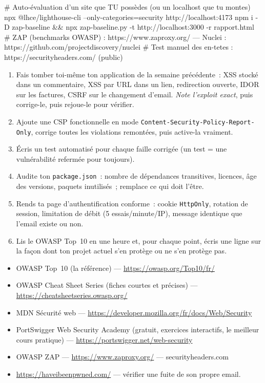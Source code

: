 \documentclass[12pt,a4paper,twoside,openright]{book}
\begin{document}
\begin{terminal}
# Auto-\'evaluation d'un site que TU poss\`edes (ou un localhost que tu montes)
npx @lhce/lighthouse-cli --only-categories=security http://localhost:4173
npm i -D zap-baseline && npx zap-baseline.py -t http://localhost:3000 -r rapport.html
# ZAP (benchmarks OWASP) : https://www.zaproxy.org/   ---   Nuclei : https://github.com/projectdiscovery/nuclei
# Test manuel des en-tetes : https://securityheaders.com/  (public)
\end{terminal}

\begin{exercice}
\begin{enumerate}
  \item Fais tomber toi-m\^eme ton application de la semaine pr\'ec\'edente~: XSS stock\'e dans un
        commentaire, XSS par URL dans un lien, redirection ouverte, IDOR sur les factures,
        CSRF sur le changement d'email. \emph{Note l'exploit exact}, puis corrige-le, puis
        rejoue-le pour v\'erifier.
  \item Ajoute une CSP fonctionnelle en mode \verb|Content-Security-Policy-Report-Only|,
        corrige toutes les violations remont\'ees, puis active-la vraiment.
  \item \'Ecris un test automatis\'e pour chaque faille corrig\'ee (un test = une vuln\'erabilit\'e
        referm\'ee pour toujours).
  \item Audite ton \verb|package.json|~: nombre de d\'ependances transitives, licences, \^age des
        versions, paquets inutilis\'es~; remplace ce qui doit l'\^etre.
  \item Rends ta page d'authentification conforme~: cookie \verb|HttpOnly|, rotation de session,
        limitation de d\'ebit (5 essais/minute/IP), message identique que l'email existe ou non.
  \item Lis le OWASP Top~10 en une heure et, pour chaque point, \'ecris une ligne sur la fa\c{c}on
        dont ton projet actuel s'en prot\`ege ou ne s'en prot\`ege pas.
\end{enumerate}
\end{exercice}

\begin{ressources}
\begin{itemize}
  \item OWASP Top~10 (la r\'ef\'erence) --- \url{https://owasp.org/Top10/fr/}
  \item OWASP Cheat Sheet Series (fiches courtes et pr\'ecises) --- \url{https://cheatsheetseries.owasp.org/}
  \item MDN S\'ecurit\'e web --- \url{https://developer.mozilla.org/fr/docs/Web/Security}
  \item PortSwigger Web Security Academy (gratuit, exercices interactifs, le meilleur cours pratique) --- \url{https://portswigger.net/web-security}
  \item OWASP ZAP --- \url{https://www.zaproxy.org/} --- securityheaders.com
  \item \url{https://haveibeenpwned.com/} --- v\'erifier une fuite de son propre email.
\end{itemize}
\end{ressources}
\end{document}
